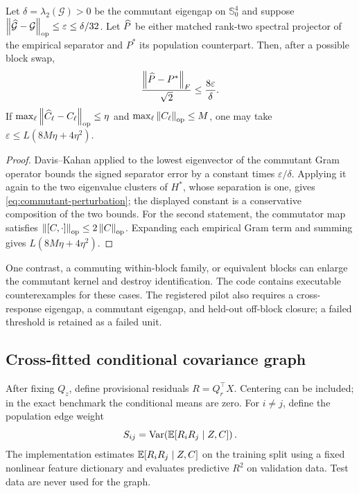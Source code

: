 \begin{proposition}
Let $\delta=\lambda_2(\mathcal G)>0$ be the commutant eigengap on $\mathbb S^4_0$ and suppose
$\left\lVert \widehat{\mathcal G}-\mathcal G\right\rVert_{\mathrm{op}}\le\varepsilon\le\delta/32$.
Let $\widehat P$ be either matched rank-two spectral projector of the empirical separator and $P^*$ its population counterpart.  Then, after a possible block swap,
\begin{equation}
 \frac{\left\lVert \widehat P-P^*\right\rVert_{F}}{\sqrt2}
 \le \frac{8\varepsilon}{\delta}.
 \label{eq:commutant-perturbation}
\end{equation}
If $\max_\ell\left\lVert \widehat C_\ell-C_\ell\right\rVert_{\mathrm{op}}\le\eta$ and
$\max_\ell\left\lVert C_\ell\right\rVert_{\mathrm{op}}\le M$, one may take
$\varepsilon\le L(8M\eta+4\eta^2)$.
\end{proposition}
\begin{proof}
Davis--Kahan applied to the lowest eigenvector of the commutant Gram operator bounds the signed separator error by a constant times $\varepsilon/\delta$.  Applying it again to the two eigenvalue clusters of $H^*$, whose separation is one, gives \eqref{eq:commutant-perturbation}; the displayed constant is a conservative composition of the two bounds.  For the second statement, the commutator map satisfies
$\left\lVert [C,\cdot]\right\rVert_{\mathrm{op}}\le2\left\lVert C\right\rVert_{\mathrm{op}}$.
Expanding each empirical Gram term and summing gives
$L(8M\eta+4\eta^2)$.
\end{proof}

One contrast, a commuting within-block family, or equivalent blocks can enlarge the commutant kernel and destroy identification.  The code contains executable counterexamples for these cases.  The registered pilot also requires a cross-response eigengap, a commutant eigengap, and held-out off-block closure; a failed threshold is retained as a failed unit.

\subsection{Cross-fitted conditional covariance graph}

After fixing $Q_z$, define provisional residuals $R=Q_r^\top X$.  Centering can be included; in the exact benchmark the conditional means are zero.  For $i\ne j$, define the population edge weight
\begin{equation}
 S_{ij}=\operatorname{Var}\!\left(\mathbb E[R_iR_j\mid Z,C]\right).
 \label{eq:edge}
\end{equation}
The implementation estimates $\mathbb E[R_iR_j\mid Z,C]$ on the training split using a fixed nonlinear feature dictionary and evaluates predictive $R^2$ on validation data.  Test data are never used for the graph.

